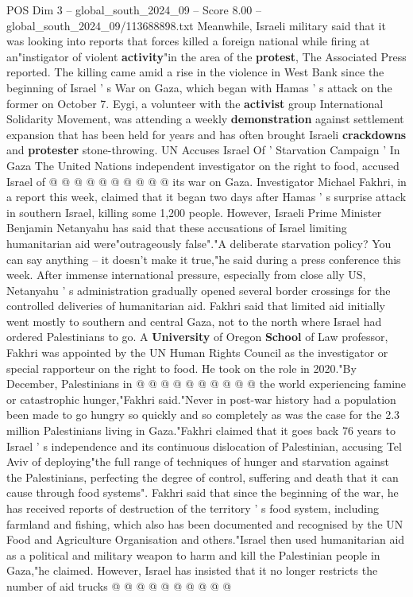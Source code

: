 \begin{textsample}{POS Dim 3 – global\_south\_2024\_09 – Score 8.00 – global\_south\_2024\_09/113688898.txt}
Meanwhile, Israeli military said that it was looking into reports that forces killed a foreign national while firing at an"instigator of violent \textbf{activity}"in the area of the \textbf{protest}, The Associated Press reported.
The killing came amid a rise in the violence in West Bank since the beginning of Israel ' s War on Gaza, which began with Hamas ' s attack on the former on October 7.
Eygi, a volunteer with the \textbf{activist} group International Solidarity Movement, was attending a weekly \textbf{demonstration} against settlement expansion that has been held for years and has often brought Israeli \textbf{crackdowns} and \textbf{protester} stone-throwing.
UN Accuses Israel Of ' Starvation Campaign ' In Gaza The United Nations independent investigator on the right to food, accused Israel of @ @ @ @ @ @ @ @ @ @ its war on Gaza.
Investigator Michael Fakhri, in a report this week, claimed that it began two days after Hamas ' s surprise attack in southern Israel, killing some 1,200 people.
However, Israeli Prime Minister Benjamin Netanyahu has said that these accusations of Israel limiting humanitarian aid were"outrageously false"."A deliberate starvation policy?
You can say anything -- it doesn't make it true,"he said during a press conference this week.
After immense international pressure, especially from close ally US, Netanyahu ' s administration gradually opened several border crossings for the controlled deliveries of humanitarian aid.
Fakhri said that limited aid initially went mostly to southern and central Gaza, not to the north where Israel had ordered Palestinians to go.
A \textbf{University} of Oregon \textbf{School} of Law professor, Fakhri was appointed by the UN Human Rights Council as the investigator or special rapporteur on the right to food.
He took on the role in 2020."By December, Palestinians in @ @ @ @ @ @ @ @ @ @ the world experiencing famine or catastrophic hunger,"Fakhri said."Never in post-war history had a population been made to go hungry so quickly and so completely as was the case for the 2.3 million Palestinians living in Gaza."Fakhri claimed that it goes back 76 years to Israel ' s independence and its continuous dislocation of Palestinian, accusing Tel Aviv of deploying"the full range of techniques of hunger and starvation against the Palestinians, perfecting the degree of control, suffering and death that it can cause through food systems".
Fakhri said that since the beginning of the war, he has received reports of destruction of the territory ' s food system, including farmland and fishing, which also has been documented and recognised by the UN Food and Agriculture Organisation and others."Israel then used humanitarian aid as a political and military weapon to harm and kill the Palestinian people in Gaza,"he claimed.
However, Israel has insisted that it no longer restricts the number of aid trucks @ @ @ @ @ @ @ @ @ @

\end{textsample}
